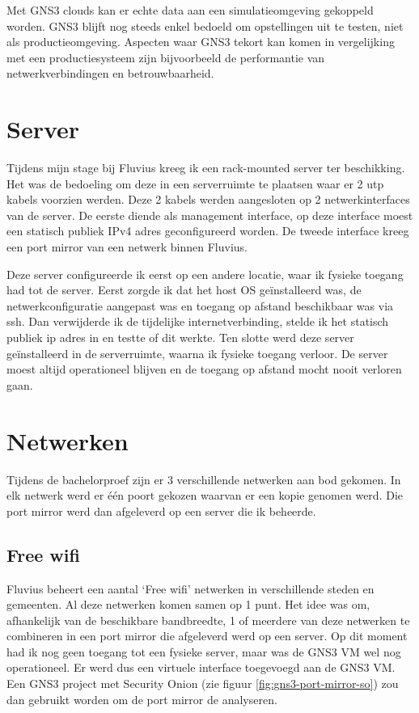 \documentclass[a4paper, 12pt]{report}
\begin{document}
Met GNS3 clouds kan er echte data aan een simulatieomgeving gekoppeld worden.
GNS3 blijft nog steeds enkel bedoeld om opstellingen uit te testen, niet als productieomgeving.
Aspecten waar GNS3 tekort kan komen in vergelijking met een productiesysteem zijn bijvoorbeeld de performantie van netwerkverbindingen en betrouwbaarheid.

\section{Server}
\label{sec:server}
Tijdens mijn stage bij Fluvius kreeg ik een rack-mounted server ter beschikking.
Het was de bedoeling om deze in een serverruimte te plaatsen waar er 2 utp kabels voorzien werden.
Deze 2 kabels werden aangesloten op 2 netwerkinterfaces van de server.
De eerste diende als management interface, op deze interface moest een statisch publiek IPv4 adres geconfigureerd worden.
De tweede interface kreeg een port mirror van een netwerk binnen Fluvius.

Deze server configureerde ik eerst op een andere locatie, waar ik fysieke toegang had tot de server.
Eerst zorgde ik dat het host OS geïnstalleerd was, de netwerkconfiguratie aangepast was en toegang op afstand beschikbaar was via ssh.
Dan verwijderde ik de tijdelijke internetverbinding, stelde ik het statisch publiek ip adres in en testte of dit werkte.
Ten slotte werd deze server geïnstalleerd in de serverruimte, waarna ik fysieke toegang verloor.
De server moest altijd operationeel blijven en de toegang op afstand mocht nooit verloren gaan.

\section{Netwerken}
Tijdens de bachelorproef zijn er 3 verschillende netwerken aan bod gekomen.
In elk netwerk werd er één poort gekozen waarvan er een kopie genomen werd.
Die port mirror werd dan afgeleverd op een server die ik beheerde.

\subsection{Free wifi}
Fluvius beheert een aantal `Free wifi' netwerken in verschillende steden en gemeenten.
Al deze netwerken komen samen op 1 punt.
Het idee was om, afhankelijk van de beschikbare bandbreedte, 1 of meerdere van deze netwerken te combineren in een port mirror die afgeleverd werd op een server.
Op dit moment had ik nog geen toegang tot een fysieke server, maar was de GNS3 VM wel nog operationeel.
Er werd dus een virtuele interface toegevoegd aan de GNS3 VM.
Een GNS3 project met Security Onion (zie figuur \ref{fig:gns3-port-mirror-so}) zou dan gebruikt worden om de port mirror de analyseren.
\end{document}
